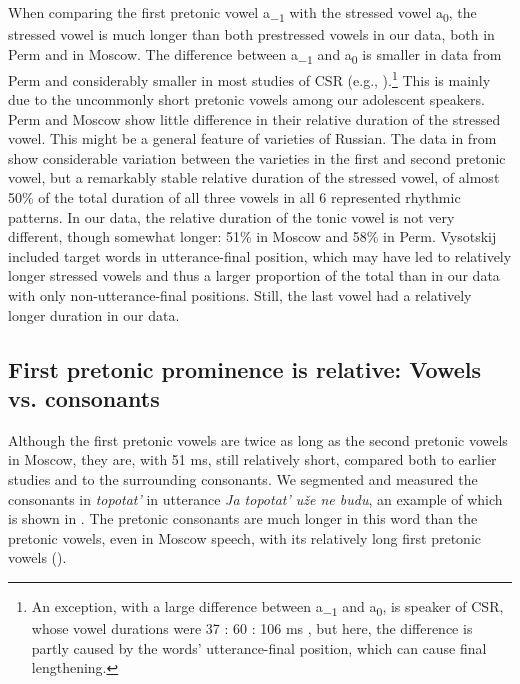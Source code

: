 \documentclass[output=paper]{langscibook}
\begin{document}
When comparing the first pretonic vowel a\textsubscript{$-1$} with the stressed vowel a\textsubscript{0}, the stressed vowel is much longer than both prestressed vowels in our data, both in Perm and in Moscow. The difference between a\textsubscript{$-1$} and\textsubscript{} a\textsubscript{0} is smaller in  data from Perm and considerably smaller in most studies of CSR (e.g., \citealt{Knjazev2006, GrammatčikovaPožarickaja2013}).\footnote{An exception, with a large difference between a\textsubscript{$-1$} and\textsubscript{} a\textsubscript{0}, is  speaker of CSR, whose vowel durations were 37 : 60 : 106 ms \citep[327]{Duryagin2018}, but here, the difference is partly caused by the words' utterance-final position, which can cause final lengthening.} This is mainly due to the uncommonly short pretonic vowels among our adolescent speakers. Perm and Moscow show little difference in their relative duration of the stressed vowel. This might be a general feature of varieties of Russian. The data in  from \citet{Vysotskij1973} show considerable variation between the varieties in the first and second pretonic vowel, but a remarkably stable relative duration of the stressed vowel, of almost 50\% of the total duration of all three vowels in all 6 represented rhythmic patterns. In our data, the relative duration of the tonic vowel is not very different, though somewhat longer: 51\% in Moscow and 58\% in Perm. Vysotskij included target words in utterance-final position, which may have led to relatively longer stressed vowels and thus a larger proportion of the total than in our data with only non-utterance-final positions. Still, the last vowel had a relatively longer duration in our data.


\subsection{First pretonic prominence is relative: Vowels vs. consonants}
\label{sec:post:4.2}
Although the first pretonic vowels are twice as long as the second pretonic vowels in Moscow, they are, with 51 ms, still relatively short, compared both to earlier studies and to the surrounding consonants. We segmented and measured the consonants in \textit{topotat'} in utterance  \textit{Ja topotat' uže ne budu}, an example of which is shown in . The pretonic consonants are much longer in this word than the pretonic vowels, even in Moscow speech, with its relatively long first pretonic vowels ().
\end{document}
